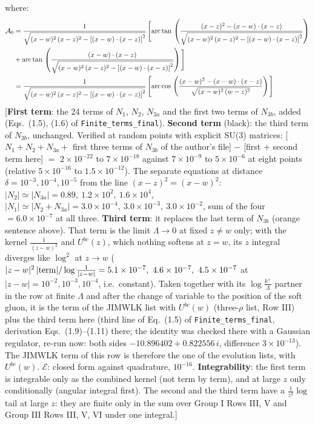 \documentclass[9pt]{article}
\numberwithin{equation}{section}
\begin{document}
where: \begin{align}
\mathcal{A}_{0} & = \frac{1}{\sqrt{(x-w)^{2}\,(x-z)^{2}-\left[(x-w)\cdot (x-z)\right]^{2}}}\, \Bigg[\mathrm{arc\,tan}\,\left(\frac{(x-z)^{2}-(x-w)\cdot (x-z)}{\sqrt{(x-w)^{2}\,(x-z)^{2}-\left[(x-w)\cdot (x-z)\right]^{2}}}\right)\notag \\ & + \mathrm{arc\,tan}\,\left(\frac{(x-w)\cdot (x-z)}{\sqrt{(x-w)^{2}\,(x-z)^{2}-\left[(x-w)\cdot (x-z)\right]^{2}}}\right) \Bigg]\notag \\ & = \frac{1}{\sqrt{(x-w)^{2}\,(x-z)^{2}-\left[(x-w)\cdot (x-z)\right]^{2}}}\, \Bigg[\mathrm{arc\,cos}\,\left(\frac{(x-w)^{2}-(x-w)\cdot (x-z)}{\sqrt{(x-w)^{2}\,(w-z)^{2}}}\right)\Bigg]
\end{align} {\color{red}[\textbf{First term}: the 24 terms of $N_{1}$, $N_{2}$, $N_{3a}$ and the first two terms of $N_{3b}$, added (Eqs.~(1.5), (1.6) of \texttt{Finite\_terms\_final}). \textbf{Second term} (black): the third term of $N_{3b}$, unchanged. Verified at random points with explicit SU(3) matrices: [$N_{1}+N_{2}+N_{3a}+$ first three terms of $N_{3b}$ of the author's file] $-$ [first $+$ second term here] $=$ $2\times10^{-22}$ to $7\times10^{-18}$ against $7\times10^{-9}$ to $5\times10^{-6}$ at eight points (relative $5\times10^{-16}$ to $1.5\times10^{-12}$). The separate equations at distance $\delta=10^{-3},10^{-4},10^{-5}$ from the line $(x-z)^{2}=(x-w)^{2}$: $|N_{2}|\simeq|N_{3a}|=0.89,\ 1.2\times10^{2},\ 1.6\times10^{4}$, $|N_{1}|\simeq|N_{2}+N_{3a}|=3.0\times10^{-4},\ 3.0\times10^{-3},\ 3.0\times10^{-2}$, sum of the four $=6.0\times10^{-7}$ at all three. \textbf{Third term}: it replaces the last term of $N_{3b}$ (orange sentence above). That term is the limit $\Lambda\to0$ at fixed $z\neq w$ only; with the kernel $\frac{1}{(z-w)^{2}}$ and $U^{bc}(z)$, which nothing softens at $z=w$, its $z$ integral diverges like $\log^{2}$ at $z\to w$ ($|z-w|^{2}\,|{\rm term}|/\log\frac{1}{|z-w|}=5.1\times10^{-7},\ 4.6\times10^{-7},\ 4.5\times10^{-7}$ at $|z-w|=10^{-2},10^{-3},10^{-4}$, i.e.\ constant). Taken together with its $\log\frac{k^{+}}{\Lambda}$ partner in the row at finite $\Lambda$ and after the change of variable to the position of the soft gluon, it is the term of the JIMWLK list with $U^{bc}(w)$ (three-$\rho$ list, Row III) plus the third term here (third line of Eq.~(1.5) of \texttt{Finite\_terms\_final}, derivation Eqs.~(1.9)--(1.11) there; the identity was checked there with a Gaussian regulator, re-run now: both sides $-10.896402+0.822556\,i$, difference $3\times10^{-13}$). The JIMWLK term of this row is therefore the one of the evolution lists, with $U^{bc}(w)$. $\mathcal{E}$: closed form against quadrature, $10^{-16}$. \textbf{Integrability}: the first term is integrable only as the combined kernel (not term by term), and at large $z$ only conditionally (angular integral first). The second and the third term have a $\frac{1}{z^{2}}\log$ tail at large $z$: they are finite only in the sum over Group I Rows III, V and Group III Rows III, V, VI under one integral.]}\par\noindent
\end{document}
